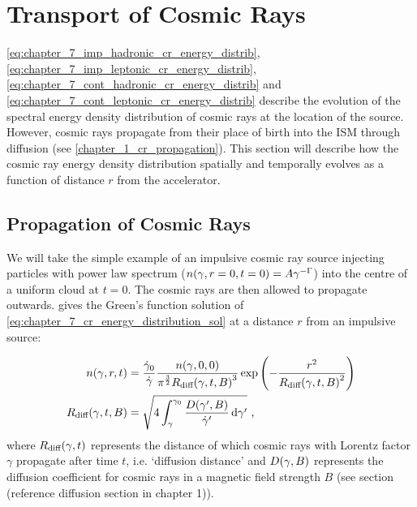 \section{Transport of Cosmic Rays} \label{sec:chapter_7_cr_SED_trans} 

\autoref{eq:chapter_7_imp_hadronic_cr_energy_distrib}, \autoref{eq:chapter_7_imp_leptonic_cr_energy_distrib}, \autoref{eq:chapter_7_cont_hadronic_cr_energy_distrib} and \autoref{eq:chapter_7_cont_leptonic_cr_energy_distrib} describe the evolution of the spectral energy density distribution of cosmic rays at the location of the source. However, cosmic rays propagate from their place of birth into the ISM through diffusion (see \autoref{chapter_1_cr_propagation}). This section will describe how the cosmic ray energy density distribution spatially and temporally evolves as a function of distance $r$ from the accelerator.

\subsection{Propagation of Cosmic Rays}

We will take the simple example of an impulsive cosmic ray source injecting particles with power law spectrum ($n\qty(\gamma,r=0,t=0)=A\gamma^{-\Gamma}$) into the centre of a uniform cloud at $t=0$. The cosmic rays are then allowed to propagate outwards. \cite{1995PhRvD..52.3265A} gives the Green's function solution of \autoref{eq:chapter_7_cr_energy_distribution_sol} at a distance $r$ from an impulsive source:

\begin{subequations}
	\begin{align}
	n\qty(\gamma,r,t)&=\frac{\dot{\gamma}_0}{\dot{\gamma}}\frac{n\qty(\gamma,0,0)}{\pi^{\frac{3}{2}}R_\text{diff}\qty(\gamma,t,B)^3}\exp\qty(-\frac{r^2}{R_\text{diff}\qty(\gamma,t,B)^2}) \label{eq:chapter_7_cr_ev_green_solution} \\
	R_\text{diff}\qty(\gamma,t,B)&=\sqrt{4\int_\gamma^{\gamma_0}\frac{D\qty(\gamma',B)}{\dot{\gamma}'}\dd{\gamma'}}\text{ ,} \label{eq:chapter_7_R_ev_green_solution}
	\end{align}
\end{subequations}  
\noindent where $R_\text{diff}\qty(\gamma,t)$ represents the distance of which cosmic rays with Lorentz factor $\gamma$ propagate after time $t$, i.e. `diffusion distance' and $D\qty(\gamma,B)$ represents the diffusion coefficient for cosmic rays in a magnetic field strength $B$ (see section (reference diffusion section in chapter 1)).

